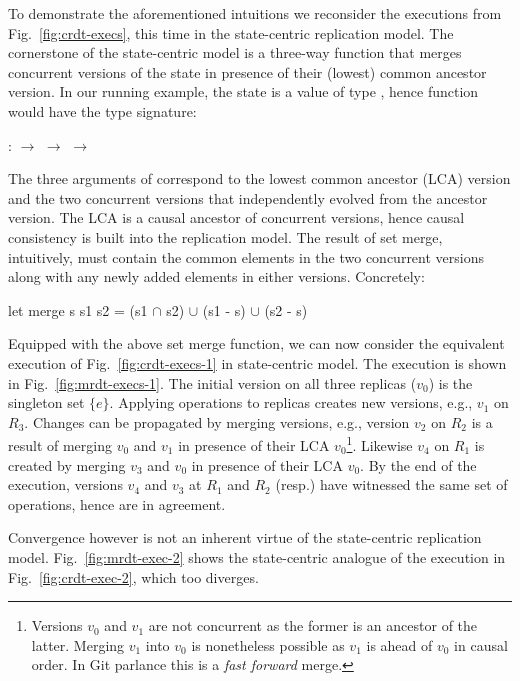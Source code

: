 To demonstrate the aforementioned intuitions we reconsider the
executions from Fig.~\ref{fig:crdt-execs}, this time in the
state-centric replication model. The cornerstone of the state-centric
model is a three-way  function that merges concurrent
versions of the state in presence of their (lowest) common ancestor
version. In our running example, the state is a value of type
, hence  function would have the type signature:
\begin{center}
 :  $\rightarrow$  $\rightarrow$ 
$\rightarrow$ 
\end{center}
The three arguments of  correspond to the lowest common
ancestor (LCA) version and the two concurrent versions that
independently evolved from the ancestor version. The LCA is a causal
ancestor of concurrent versions, hence causal consistency is built
into the replication model. The result of set merge, intuitively, must
contain the common elements in the two concurrent versions along with
any newly added elements in either versions. Concretely:
\begin{ocaml}
let merge s s1 s2 = 
              (s1 $\cap$ s2) $\cup$ (s1 - s) $\cup$ (s2 - s)
\end{ocaml}
Equipped with the above set merge function, we can now consider the
equivalent execution of Fig.~\ref{fig:crdt-execs-1} in state-centric
model. The execution is shown in Fig.~\ref{fig:mrdt-execs-1}. The
initial version on all three replicas ($v_0$) is the singleton set
$\{e\}$. Applying operations to replicas creates new versions, e.g.,
$v_1$ on $R_3$. Changes can be propagated by merging versions, e.g.,
version $v_2$ on $R_2$ is a result of merging $v_0$ and $v_1$ in
presence of their LCA $v_0$\footnote{Versions $v_0$ and $v_1$ are not
  concurrent as the former is an ancestor of the latter. Merging $v_1$
  into $v_0$ is nonetheless possible as $v_1$ is ahead of $v_0$ in
  causal order. In Git parlance this is a \emph{fast forward} merge.}.
Likewise $v_4$ on $R_1$ is created by merging $v_3$ and $v_0$ in
presence of their LCA $v_0$. By the end of the execution, versions $v_4$
and $v_3$ at $R_1$ and $R_2$ (resp.) have witnessed the same set of
operations, hence are in agreement.

Convergence however is not an inherent virtue of the state-centric
replication model. Fig.~\ref{fig:mrdt-exec-2} shows the state-centric
analogue of the execution in Fig.~\ref{fig:crdt-exec-2}, which too
diverges.

